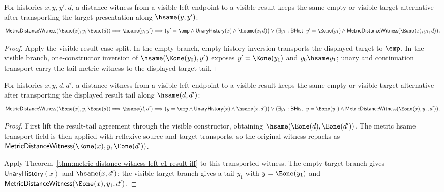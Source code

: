 \begin{theorem}
\label{thm:metric-distance-witness-left-e1-result-hsame-target}
For histories $x,y,y',d$, a distance witness from a visible left endpoint to a
visible result keeps the same empty-or-visible target alternative after
transporting the target presentation along $\hsame(y,y')$:
$$
\mathsf{MetricDistanceWitness}(\Eone(x),y,\Eone(d))
\Longrightarrow
\hsame(y,y')
\Longrightarrow
\bigl(y'=\emp\land\mathsf{UnaryHistory}(x)\land\hsame(x,d)\bigr)
\lor
\bigl(\exists y_1:\mathsf{BHist}.\;
y'=\Eone(y_1)\land
\mathsf{MetricDistanceWitness}(\Eone(x),y_1,d)\bigr).
$$
\end{theorem}
\begin{proof}
Apply the visible-result case split. In the empty branch, empty-history
inversion transports the displayed target to $\emp$. In the visible branch,
one-constructor inversion of $\hsame(\Eone(y_0),y')$ exposes
$y'=\Eone(y_1)$ and $y_0\hsame y_1$; unary and continuation transport
carry the tail metric witness to the displayed target tail.
\end{proof}

\begin{theorem}
\label{thm:metric-distance-witness-left-e1-result-hsame-result}
For histories $x,y,d,d'$, a distance witness from a visible left endpoint to a
visible result keeps the same empty-or-visible target alternative after
transporting the displayed result tail along $\hsame(d,d')$:
$$
\mathsf{MetricDistanceWitness}(\Eone(x),y,\Eone(d))
\Longrightarrow
\hsame(d,d')
\Longrightarrow
\bigl(y=\emp\land\mathsf{UnaryHistory}(x)\land\hsame(x,d')\bigr)
\lor
\bigl(\exists y_1:\mathsf{BHist}.\;
y=\Eone(y_1)\land
\mathsf{MetricDistanceWitness}(\Eone(x),y_1,d')\bigr).
$$
\end{theorem}
\begin{proof}
First lift the result-tail agreement through the visible constructor, obtaining
$\hsame(\Eone(d),\Eone(d'))$. The metric hsame transport field is then applied
with reflexive source and target transports, so the original witness repacks as
$\mathsf{MetricDistanceWitness}(\Eone(x),y,\Eone(d'))$.

Apply Theorem~\ref{thm:metric-distance-witness-left-e1-result-iff} to this
transported witness. The empty target branch gives
$\mathsf{UnaryHistory}(x)$ and $\hsame(x,d')$; the visible target branch gives a
tail $y_1$ with $y=\Eone(y_1)$ and
$\mathsf{MetricDistanceWitness}(\Eone(x),y_1,d')$.
\end{proof}

